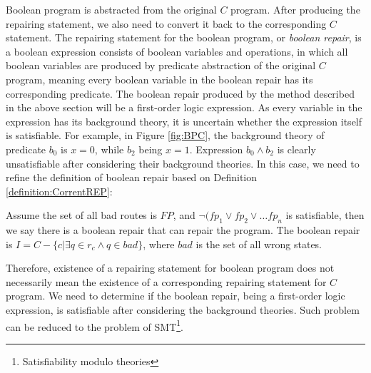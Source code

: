 Boolean program is abstracted from the original $C$ program. After producing the repairing statement, we also need to convert it back to the corresponding $C$ statement.
The repairing statement for the boolean program, or {\it boolean repair}, is a boolean expression consists of boolean variables and operations, in which all boolean variables are produced by predicate abstraction of the original $C$ program, meaning every boolean variable in the boolean repair has its corresponding predicate.
The boolean repair produced by the method described in the above section will be a first-order logic expression.
As every variable in the expression has its background theory, it is uncertain whether the expression itself is satisfiable.
For example, in Figure \ref{fig:BPC}, the background theory of predicate $b_{0}$ is $x = 0$, while $b_{2}$ being $x = 1$. Expression $b_{0} \wedge b_{2}$ is clearly unsatisfiable after considering their background theories.
In this case, we need to refine the definition of boolean repair based on Definition \ref{definition:CorrentREP}:

\begin{definition}
Assume the set of all bad routes is $FP$, and $\neg (fp_{1} \vee fp_{2} \vee\dots fp_{n}$ is satisfiable, then we say there is a boolean repair that can repair the program.
The boolean repair is $I = C - \{c | \exists q \in r_{c} \wedge q \in bad\}$, where $bad$ is the set of all wrong states.
\end{definition}

Therefore, existence of a repairing statement for boolean program does not necessarily mean the existence of a corresponding repairing statement for $C$ program.
We need to determine if the boolean repair, being a first-order logic expression, is satisfiable after considering the background theories. Such problem can be reduced to the problem of SMT\footnote{Satisfiability modulo theories}\cite{SMT}.

